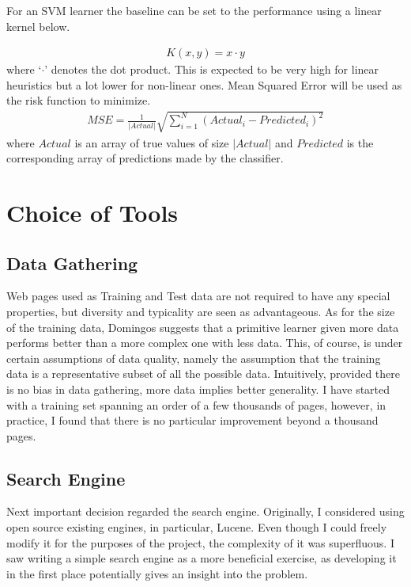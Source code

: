 \documentclass[12pt,notitlepage,twoside]{scrreprt}
\begin{document}
For an SVM learner the baseline can be set to the performance using a linear
kernel below.

\begin{gather*}
K(x,y) = x \cdot y
\end{gather*}
where `\(\cdot\)' denotes the dot product.
This is expected to be very high for linear heuristics but a lot lower for
non-linear ones.
Mean Squared Error will be used as the risk function to minimize.
\begin{gather*}
  MSE = \frac{1}{|Actual|}\sqrt{\sum_{i=1}^{N}(Actual_i - Predicted_i)^2}
\end{gather*}
where \(Actual\) is an array of true values of size \(|Actual|\) and
\(Predicted\) is the corresponding array of predictions made by the classifier.

\section{Choice of Tools}

\subsection{Data Gathering}
Web pages used as Training and Test data are not required to have any special
properties, but diversity and typicality are seen as advantageous. As for the
size of the training data, Domingos \cite{domingos} suggests that a primitive
learner given more data performs better than a more complex one with less data.
This, of course, is under certain assumptions of data quality, namely the
assumption that the training data is a representative subset of all the
possible data. Intuitively, provided there is no bias in data gathering, more
data implies better generality. I have started with a training set spanning an
order of a few thousands of pages, however, in practice, I found that there is
no particular improvement beyond a thousand pages. 

\subsection{Search Engine}

Next important decision regarded the search engine.  Originally, I considered
using open source existing engines, in particular, Lucene. Even though I could
freely modify it for the purposes of the project, the complexity of it was
superfluous. I saw writing a simple search engine as a more beneficial
exercise, as developing it in the first place potentially gives an insight into
the problem.
\end{document}
